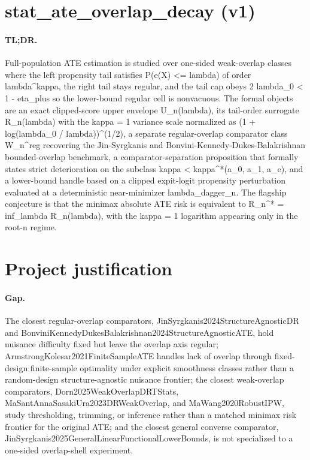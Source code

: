 \documentclass{article}
\begin{document}
\section*{stat_ate_overlap_decay (v1)}

\paragraph{TL;DR.} Full-population ATE estimation is studied over one-sided weak-overlap classes where the left propensity tail satisfies P(e(X) <= lambda) of order lambda^kappa, the right tail stays regular, and the tail cap obeys 2 lambda_0 < 1 - eta_plus so the lower-bound regular cell is nonvacuous. The formal objects are an exact clipped-score upper envelope U_n(lambda), its tail-order surrogate R_n(lambda) with the kappa = 1 variance scale normalized as (1 + log(lambda_0 / lambda))^(1/2), a separate regular-overlap comparator class W_n^reg recovering the Jin-Syrgkanis and Bonvini-Kennedy-Dukes-Balakrishnan bounded-overlap benchmark, a comparator-separation proposition that formally states strict deterioration on the subclass kappa < kappa^*(a_0, a_1, a_e), and a lower-bound handle based on a clipped expit-logit propensity perturbation evaluated at a deterministic near-minimizer lambda_dagger_n. The flagship conjecture is that the minimax absolute ATE risk is equivalent to R_n^* = inf_lambda R_n(lambda), with the kappa = 1 logarithm appearing only in the root-n regime.

\section{Project justification}

\paragraph{Gap.} The closest regular-overlap comparators, JinSyrgkanis2024StructureAgnosticDR and BonviniKennedyDukesBalakrishnan2024StructureAgnosticATE, hold nuisance difficulty fixed but leave the overlap axis regular; ArmstrongKolesar2021FiniteSampleATE handles lack of overlap through fixed-design finite-sample optimality under explicit smoothness classes rather than a random-design structure-agnostic nuisance frontier; the closest weak-overlap comparators, Dorn2025WeakOverlapDRTStats, MaSantAnnaSasakiUra2023DRWeakOverlap, and MaWang2020RobustIPW, study thresholding, trimming, or inference rather than a matched minimax risk frontier for the original ATE; and the closest general converse comparator, JinSyrgkanis2025GeneralLinearFunctionalLowerBounds, is not specialized to a one-sided overlap-shell experiment.
\end{document}
